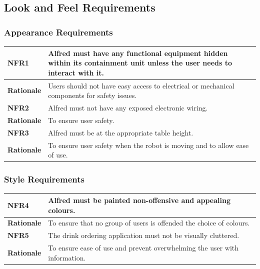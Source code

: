 \documentclass [11pt]{article}
\begin{document}
\subsection {Look and Feel Requirements}

\subsubsection{Appearance Requirements}
	
\begin{longtable}{| p{ } | p{ } | }\hline 
\rowcolor{tableCell}\textbf{NFR1} & Alfred must have any functional equipment hidden within its containment unit unless the user needs to interact with it. \\ \hline
\textbf{Rationale} & Users should not have easy access to electrical or mechanical components for safety issues.\\ \hline 
\rowcolor{tableCell}\textbf{NFR2} & Alfred must not have any exposed electronic wiring. \\ \hline
\textbf{Rationale} & To ensure user safety.\\ \hline 
\rowcolor{tableCell}\textbf{NFR3} & Alfred must be at the appropriate table height. \\ \hline
\textbf{Rationale} & To ensure user safety when the robot is moving and to allow ease of use.\\ \hline 
\end{longtable}

\subsubsection{Style Requirements}

\begin{longtable}{| p{ } | p{ } | }\hline 
\rowcolor{tableCell}\textbf{NFR4} & Alfred must be painted non-offensive and appealing colours. \\ \hline
\textbf{Rationale} & To ensure that no group of users is offended the choice of colours. \\ \hline  
\rowcolor{tableCell}\textbf{NFR5} & The drink ordering application must not be visually cluttered. \\ \hline
\textbf{Rationale} & To ensure ease of use and prevent overwhelming the user with information.\\ \hline 
\end{longtable}
\end{document}
